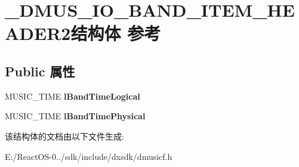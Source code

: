 \hypertarget{struct___d_m_u_s___i_o___b_a_n_d___i_t_e_m___h_e_a_d_e_r2}{}\section{\+\_\+\+D\+M\+U\+S\+\_\+\+I\+O\+\_\+\+B\+A\+N\+D\+\_\+\+I\+T\+E\+M\+\_\+\+H\+E\+A\+D\+E\+R2结构体 参考}
\label{struct___d_m_u_s___i_o___b_a_n_d___i_t_e_m___h_e_a_d_e_r2}
\subsection*{Public 属性}
\begin{DoxyCompactItemize}
\item 
\mbox{\label{struct___d_m_u_s___i_o___b_a_n_d___i_t_e_m___h_e_a_d_e_r2_a7d1a638d905a793581c46b6663fa739a}} 
M\+U\+S\+I\+C\+\_\+\+T\+I\+ME {\bfseries l\+Band\+Time\+Logical}
\item 
\mbox{\label{struct___d_m_u_s___i_o___b_a_n_d___i_t_e_m___h_e_a_d_e_r2_ab397da51ada3b4ac9c764af9ebb9fdb2}} 
M\+U\+S\+I\+C\+\_\+\+T\+I\+ME {\bfseries l\+Band\+Time\+Physical}
\end{DoxyCompactItemize}


该结构体的文档由以下文件生成\+:\begin{DoxyCompactItemize}
\item 
E\+:/\+React\+O\+S-\/0../sdk/include/dxsdk/dmusicf.\+h\end{DoxyCompactItemize}
